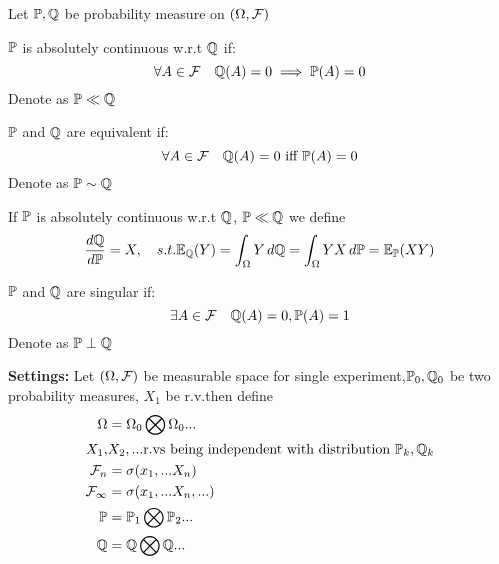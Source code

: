 Let $\mathbb{P}, \mathbb{Q}$ be probability measure on $(\Omega, \mathcal{F})$ 
\begin{dfn}
    $\mathbb{P}$ is absolutely continuous w.r.t $\mathbb{Q}$ if:
    \begin{equation*}
        \forall A\in\mathcal{F} \quad \mathbb{Q}(A)=  0 \implies \mathbb{P}(A)= 0
    \end{equation*}Denote as $\mathbb{P}\ll\mathbb{Q}$
\end{dfn}\vspace{0.5cm}
\begin{dfn}
    $\mathbb{P}$ and $\mathbb{Q}$ are equivalent if:
    \begin{equation*}
        \forall A\in\mathcal{F} \quad \mathbb{Q}(A)=  0 \text{ iff } \mathbb{P}(A)= 0
    \end{equation*}Denote as $\mathbb{P}\sim\mathbb{Q}$
\end{dfn}\vspace{0.5cm}
\begin{dfn}
    If $\mathbb{P}$ is absolutely continuous w.r.t $\mathbb{Q}$, $\mathbb{P}\ll\mathbb{Q}$ we define \begin{equation*}
        \frac{\mathop{}\!d \mathbb{Q}}{\mathop{}\!d \mathbb{P}} = X,\quad s.t. \mathbb{E}_{\mathbb{Q}} (Y) = \int_{\Omega} Y\mathop{}\!d \mathbb{Q} = \int_{\Omega} Y X \mathop{}\!d \mathbb{P} = \mathbb{E}_{\mathbb{P}} (XY)
    \end{equation*}
\end{dfn}
\begin{dfn}
    $\mathbb{P}$ and $\mathbb{Q}$ are singular if:
    \begin{equation*}
        \exists A\in\mathcal{F} \quad \mathbb{Q}(A)=  0, \mathbb{P}(A)= 1
    \end{equation*}Denote as $\mathbb{P}\perp\mathbb{Q}$
\end{dfn}
\newpage
\textbf{Settings:} Let $(\Omega, \mathcal{F})$ be measurable space for single experiment,$\mathbb{P}_0, \mathbb{Q}_0$ be two probability measures, $X_1$ be r.v.then define
\begin{align*}
    \Omega &= \Omega_0 \bigotimes \Omega_0 ... \\
    X_1, &X_2, ... \text{r.vs being independent with distribution $\mathbb{P}_k, \mathbb{Q}_k$}\\
    \mathcal{F}_n &= \sigma(x_1, ... X_n) \\
    \mathcal{F}_\infty &= \sigma(x_1, ... X_n, ...) \\
    \mathbb{P} &= \mathbb{P}_1 \bigotimes \mathbb{P}_2 ... \\
    \mathbb{Q} &= \mathbb{Q} \bigotimes \mathbb{Q} ... \\
\end{align*} 

